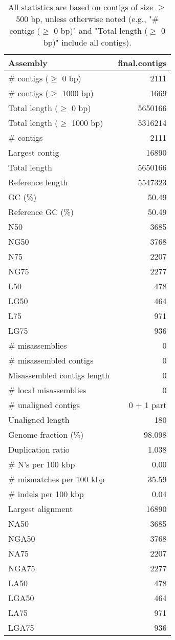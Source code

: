 \documentclass[12pt,a4paper]{article}
\begin{document}
\begin{table}[ht]
\begin{center}
\caption{All statistics are based on contigs of size $\geq$ 500 bp, unless otherwise noted (e.g., "\# contigs ($\geq$ 0 bp)" and "Total length ($\geq$ 0 bp)" include all contigs).}
\begin{tabular}{|l*{1}{|r}|}
\hline
Assembly & final.contigs \\ \hline
\# contigs ($\geq$ 0 bp) & 2111 \\ \hline
\# contigs ($\geq$ 1000 bp) & 1669 \\ \hline
Total length ($\geq$ 0 bp) & 5650166 \\ \hline
Total length ($\geq$ 1000 bp) & 5316214 \\ \hline
\# contigs & 2111 \\ \hline
Largest contig & 16890 \\ \hline
Total length & 5650166 \\ \hline
Reference length & 5547323 \\ \hline
GC (\%) & 50.49 \\ \hline
Reference GC (\%) & 50.49 \\ \hline
N50 & 3685 \\ \hline
NG50 & 3768 \\ \hline
N75 & 2207 \\ \hline
NG75 & 2277 \\ \hline
L50 & 478 \\ \hline
LG50 & 464 \\ \hline
L75 & 971 \\ \hline
LG75 & 936 \\ \hline
\# misassemblies & 0 \\ \hline
\# misassembled contigs & 0 \\ \hline
Misassembled contigs length & 0 \\ \hline
\# local misassemblies & 0 \\ \hline
\# unaligned contigs & 0 + 1 part \\ \hline
Unaligned length & 180 \\ \hline
Genome fraction (\%) & 98.098 \\ \hline
Duplication ratio & 1.038 \\ \hline
\# N's per 100 kbp & 0.00 \\ \hline
\# mismatches per 100 kbp & 35.59 \\ \hline
\# indels per 100 kbp & 0.04 \\ \hline
Largest alignment & 16890 \\ \hline
NA50 & 3685 \\ \hline
NGA50 & 3768 \\ \hline
NA75 & 2207 \\ \hline
NGA75 & 2277 \\ \hline
LA50 & 478 \\ \hline
LGA50 & 464 \\ \hline
LA75 & 971 \\ \hline
LGA75 & 936 \\ \hline
\end{tabular}
\end{center}
\end{table}
\end{document}
